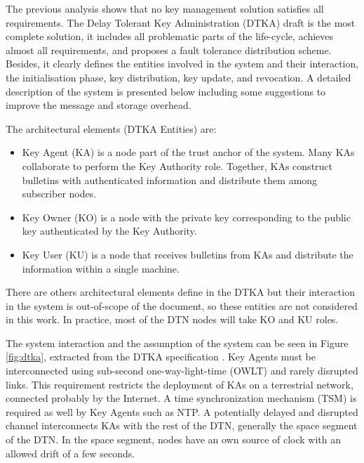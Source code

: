 The previous analysis shows that no key management solution satisfies all requirements. The Delay Tolerant Key Administration (DTKA) draft is the most complete solution, it includes all problematic parts of the life-cycle, achieves almost all requirements, and proposes a fault tolerance distribution scheme. Besides, it clearly defines the entities involved in the system and their interaction, the initialisation phase, key distribution, key update, and revocation. A detailed description of the system is presented below including some suggestions to improve the message and storage overhead. 

The architectural elements (DTKA Entities) are:

\begin{itemize}
  \item  Key Agent (KA) is a node part of the trust anchor of the system. Many KAs collaborate to perform the Key Authority role. Together, KAs construct bulletins with authenticated information and distribute them among subscriber nodes.
  \item Key Owner (KO) is a node with the private key corresponding to the public key authenticated by the Key Authority.
  \item Key User (KU) is a node that receives bulletins from KAs and distribute the information within a single machine.
\end{itemize}

There are others architectural elements define in the DTKA but their interaction in the system is out-of-scope of the document, so these entities are not considered in this work. In practice, most of the DTN nodes will take KO and KU roles.


The system interaction and the assumption of the system can be seen in Figure \ref{fig:dtka}, extracted from the DTKA specification \cite{burleigh-dtnwg-dtka-01}. Key Agents must be interconnected using sub-second one-way-light-time (OWLT) and rarely disrupted links. This requirement restricts the deployment of KAs on a terrestrial network, connected probably by the Internet. A time synchronization mechanism (TSM) is required as well by Key Agents such as NTP. A potentially delayed and disrupted channel interconnects KAs with the rest of the DTN, generally the space segment of the DTN. In the space segment, nodes have an own source of clock with an allowed drift of a few seconds.     



